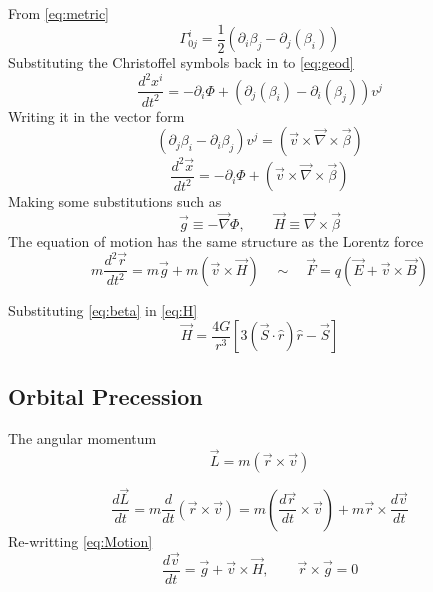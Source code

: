 \documentclass[12pt, a4paper]{article}
\theoremstyle{plain}
\theoremstyle{definition}
\theoremstyle{remark}
\begin{document}
From \eqref{eq:metric}
\begin{equation}
    \Gamma^i_{0j} = \frac{1}{2}\left(\partial_i\beta_j - \partial_j(\beta_i)\right)
\end{equation}
Substituting the Christoffel symbols back in to \eqref{eq:geod}
\begin{equation}
    \frac{d^2 x^i}{dt^2} = -\partial_i\Phi + \left(\partial_j(\beta_i) - \partial_i(\beta_j)\right)v^j
\end{equation}
Writing it in the vector form
\begin{equation}
    \left(\partial_j\beta_i - \partial_i\beta_j\right)v^j = \left(\vec{v} \times \vec{\nabla} \times \vec{\beta}\right)
\end{equation}
\begin{equation}
     \frac{d^2 \vec{x}}{dt^2} = -\partial_i \Phi + \left(\vec{v}\times\vec{\nabla}\times\vec{\beta}\right)
\end{equation}
Making some substitutions such as
\begin{equation}
    \vec{g} \equiv -\vec{\nabla}\Phi, \qquad \vec{H} \equiv \vec{\nabla}\times\vec{\beta}
    \label{eq:H}
\end{equation}
The equation of motion has the same structure as the Lorentz force 
\begin{equation}
     m\frac{d^2\vec{r}}{dt^2} = m\vec{g} + m\left(\vec{v}\times\vec{H}\right)
    \quad \sim \quad \vec{F} = q\left(\vec{E} + \vec{v}\times\vec{B}\right)
    \label{eq:Motion}
\end{equation}

Substituting \eqref{eq:beta} in \eqref{eq:H}
\begin{equation}
     \vec{H} = \frac{4G}{r^3}\left[3(\vec{S}\cdot\hat{r})\hat{r} - \vec{S}\right]
\end{equation}
\subsection{Orbital Precession}
The angular momentum
\begin{equation}
    \vec{L} = m(\vec{r}\times\vec{v})
\end{equation}

\begin{equation}
    \frac{d\vec{L}}{dt} = m\frac{d}{dt}(\vec{r}\times\vec{v}) = m\left(\frac{d\vec{r}}{dt}\times\vec{v}\right) + m\vec{r}\times\frac{d\vec{v}}{dt}
\end{equation}
Re-writting \eqref{eq:Motion}
\begin{equation}
    \frac{d\vec{v}}{dt} = \vec{g} + \vec{v}\times\vec{H}, \qquad \vec{r}\times\vec{g} = 0
\end{equation}
\end{document}
